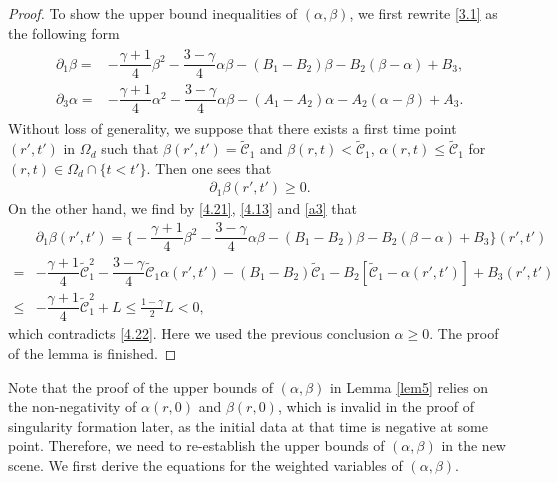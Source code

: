 \documentclass[11pt,reqno]{article}
\newcommand{\fr}{\frac}
\newcommand{\pa}{\partial}
\numberwithin{equation}{section}
\begin{document}
\begin{proof}
To show the upper bound inequalities of $(\alpha,\beta)$, we first rewrite \eqref{3.1} as the following form
\begin{align}\label{4.21}
\begin{split}
\pa_1 \beta =& -\dfrac{\gamma+1}{4} \beta^{2}
  -\dfrac{3-\gamma}{4} \alpha \beta-(B_{1}-B_2)\beta- B_{2} (\beta-\alpha) +B_3, \\[8pt]
\pa_3 \alpha =& -\dfrac{\gamma+1}{4} \alpha^{2}
  -\dfrac{3-\gamma}{4} \alpha \beta-(A_{1}-A_2)\alpha- A_{2} (\alpha-\beta) +A_3.
\end{split}
\end{align}
Without loss of generality, we suppose that there exists a first time point $(r',t')$ in $\Omega_d$ such that $\beta(r',t')=\widetilde{\mathcal{C}}_1$ and $\beta(r,t)<\widetilde{\mathcal{C}}_1$, $\alpha(r,t)\leq \widetilde{\mathcal{C}}_1$ for $(r,t)\in\Omega_d\cap\{t<t'\}$. Then one sees that
\begin{align}\label{4.22}
\pa_1\beta(r',t')\geq0.
\end{align}
On the other hand, we find by \eqref{4.21}, \eqref{4.13} and \eqref{a3} that
\begin{align*}
&\pa_1 \beta(r',t') = \bigg\{-\dfrac{\gamma+1}{4} \beta^{2}
  -\dfrac{3-\gamma}{4} \alpha \beta-(B_{1}-B_2)\beta- B_{2} (\beta-\alpha) +B_3\bigg\}(r',t') \\
  =&-\dfrac{\gamma+1}{4}\widetilde{\mathcal{C}}_{1}^2 -\dfrac{3-\gamma}{4}\widetilde{\mathcal{C}}_{1}\alpha(r',t') -(B_{1}-B_2)\widetilde{\mathcal{C}}_{1} -B_{2} [\widetilde{\mathcal{C}}_{1}-\alpha(r',t')] +B_3(r',t') \\
  \leq & -\dfrac{\gamma+1}{4}\widetilde{\mathcal{C}}_{1}^2 +L\leq\fr{1-\gamma}{2}L<0,
\end{align*}
which contradicts \eqref{4.22}. Here we used the previous conclusion $\alpha\geq0$.
The proof of the lemma is finished.
\end{proof}

Note that the proof of the upper bounds of $(\alpha, \beta)$ in Lemma \ref{lem5} relies on the non-negativity of $\alpha(r,0)$ and $\beta(r,0)$, which is invalid in the proof of singularity formation later, as the initial data at that time is negative at some point. Therefore, we need to re-establish the upper bounds of $(\alpha, \beta)$ in the new scene. We first derive the equations for the weighted variables of $(\alpha, \beta)$.
\end{document}
